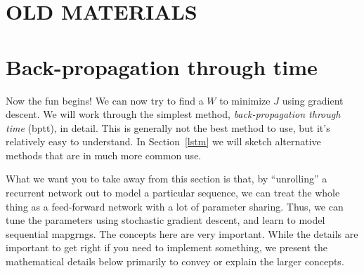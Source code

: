         

        

        

        




        

        

        

\section{OLD MATERIALS}




\section{Back-propagation through time}
\label{sec:bptt}

Now the fun begins!  We can now try to find a $W$ to minimize $J$
using gradient descent.  We will work through the simplest method,
{\em back-propagation through time} ({\sc bptt}), in detail.  This is generally not the best
method to use, but it's relatively easy to understand.  In
Section~\ref{lstm} we will sketch alternative methods that are in much
more common use.

\bigskip 
\begin{noticebox}
  What we want you to take away from this section is that, by
  ``unrolling'' a recurrent network out to model a particular
  sequence, we can treat the whole thing as a feed-forward network
  with a lot of parameter sharing.  Thus, we can tune the parameters
  using stochastic gradient descent, and learn to model sequential
  mapgrngs.  The concepts here are very important.  While the details
  are important to get right if you need to implement something, we
  present the mathematical details below primarily to convey or
  explain the larger concepts.
\end{noticebox}


